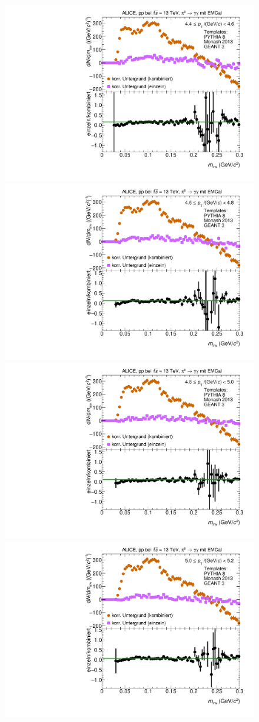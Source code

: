 \begin{figure}[t]
\begin{multicols}{2}
\end{multicols}
\begin{multicols}{2}
    \includegraphics[width=.65\linewidth]{Anhang/BackgroundWithRatio16_Data_2016.pdf}\par
    \includegraphics[width=.65\linewidth]{Anhang/BackgroundWithRatio17_Data_2016.pdf}\par
\end{multicols}
\begin{multicols}{2}
    \includegraphics[width=.65\linewidth]{Anhang/BackgroundWithRatio18_Data_2016.pdf}\par
    \includegraphics[width=.65\linewidth]{Anhang/BackgroundWithRatio19_Data_2016.pdf}\par
\end{multicols}
\end{figure}
\clearpage

